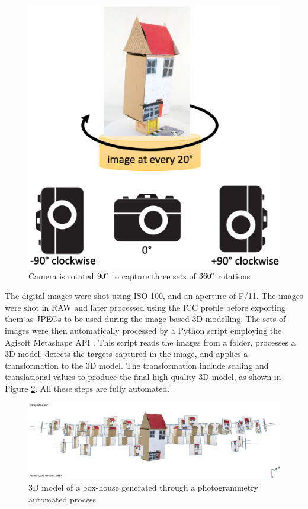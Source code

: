 \documentclass[acmlarge,screen,dvipsnames]{acmart}
\begin{document}
\begin{figure}[h]
\includegraphics[width=0.6\linewidth]{images/camerarot.png}
\caption{Camera is rotated $90\degree$ to capture three sets of $360\degree$ rotations} \label{fig:camrot} 
\end{figure}

The digital images were shot using ISO 100, and an aperture of F/11. The
images were shot in RAW and later processed using the ICC profile before
exporting them as JPEGs to be used during the image-based 3D modelling. The sets of images were then automatically processed by a Python
script employing the Agisoft Metashape API \cite{Metashapesite}. This
script reads the images from a folder, processes a 3D model, detects the
targets captured in the image, and applies a transformation to the 3D model. The transformation include scaling and translational values to produce the final high quality 3D model, as shown in
Figure \ref{fig:metashape}. All these steps are fully automated.


\begin{figure}[h] \centering
\includegraphics[width=1\linewidth]{images/metashape.png} 
\caption{3D model of a box-house generated through a photogrammetry automated
process} \label{fig:metashape}  
\end{figure}
\end{document}
